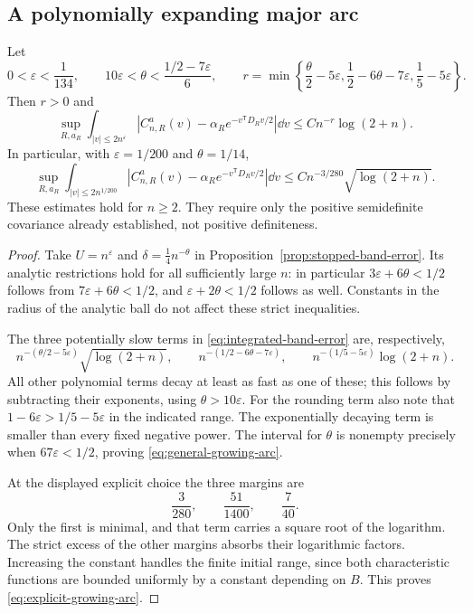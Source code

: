 \subsection{A polynomially expanding major arc}
\begin{theorem}
\label{thm:growing-major-arc}
Let
\[
 0<\varepsilon<\frac1{134},\qquad
 10\varepsilon<\theta<\frac{1/2-7\varepsilon}{6},\qquad
 r=\min\left\{\frac\theta2-5\varepsilon,
              \frac12-6\theta-7\varepsilon,
              \frac15-5\varepsilon\right\}.
\]
Then $r>0$ and
\begin{equation}\label{eq:general-growing-arc}
 \sup_{R,a_R}\int_{|v|\le2n^\varepsilon}
 |C^a_{n,R}(v)-\alpha_Re^{-v^{\mathsf T}D_Rv/2}|\dd v
       \le C n^{-r}\log(2+n).
\end{equation}
In particular, with $\varepsilon=1/200$ and $\theta=1/14$,
\begin{equation}\label{eq:explicit-growing-arc}
 \sup_{R,a_R}\int_{|v|\le2n^{1/200}}
 |C^a_{n,R}(v)-\alpha_Re^{-v^{\mathsf T}D_Rv/2}|\dd v
       \le C n^{-3/280}\sqrt{\log(2+n)}.
\end{equation}
These estimates hold for $n\ge2$. They require only the positive
semidefinite covariance already established, not positive definiteness.
\end{theorem}
\begin{proof}
Take $U=n^\varepsilon$ and $\delta=\tfrac14n^{-\theta}$ in
Proposition~\ref{prop:stopped-band-error}. Its analytic restrictions hold
for all sufficiently large $n$: in particular
$3\varepsilon+6\theta<1/2$ follows from
$7\varepsilon+6\theta<1/2$, and
$\varepsilon+2\theta<1/2$ follows as well. Constants in the radius
of the analytic ball do not affect these strict inequalities.

The three potentially slow terms in \eqref{eq:integrated-band-error}
are, respectively,
\[
 n^{-(\theta/2-5\varepsilon)}\sqrt{\log(2+n)},\qquad
 n^{-(1/2-6\theta-7\varepsilon)},\qquad
 n^{-(1/5-5\varepsilon)}\log(2+n).
\]
All other polynomial terms decay at least as fast as one of these;
this follows by subtracting their exponents, using $\theta>10\varepsilon$.
For the rounding term also note that
$1-6\varepsilon>1/5-5\varepsilon$ in the indicated range.
The exponentially decaying term is smaller than every fixed negative
power. The interval for $\theta$ is nonempty precisely when
$67\varepsilon<1/2$, proving \eqref{eq:general-growing-arc}.

At the displayed explicit choice the three margins are
\[
 \frac3{280},\qquad \frac{51}{1400},\qquad \frac7{40}.
\]
Only the first is minimal, and that term carries a square root of the
logarithm. The strict excess of the other margins absorbs their
logarithmic factors. Increasing the constant handles the finite initial
range, since both characteristic functions are bounded uniformly by
a constant depending on $B$. This proves \eqref{eq:explicit-growing-arc}.
\end{proof}

